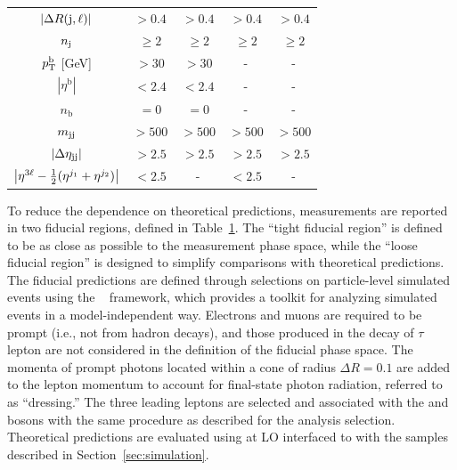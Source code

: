 \begin{table}[!ht]
\begin{center}
\begin{tabular}{c|c|c|c|c}
  $\left|\Delta R(\mathrm{j}, \ell)\right|$            & $ > 0.4$  & $> 0.4$       & $> 0.4$        & $> 0.4$ \\
  $n_{\mathrm{\mathrm{j}}}           $    & $\ge 2$   & $\ge 2$       & $\ge 2$        & $\ge 2$    \\
  $p_{\mathrm{T}}^{\mathrm{b}}         $ [GeV] & $ > 30$   & $ > 30$       &   -            &   -     \\
    $\left|\eta^{\mathrm{b}}\right|  $      & $< 2.4$   & $< 2.4$ &   -            &   -     \\
  $n_{\text{b}}       $         & $= 0$     & $= 0$         &   -            &   -     \\
  $m_{\mathrm{jj}}             $               & $> 500$   & $> 500$       & $> 500$        & $> 500$ \\
  $\left|\Delta\eta_{\mathrm{jj}} \right|$            &$> 2.5$         & $> 2.5$ & $> 2.5$ & $> 2.5$ \\
  $\left| \eta^{3\ell} - \frac{1}{2}(\eta^{j_{1}} + \eta^{j_{2}}) \right|$            & $< 2.5$ & - & $< 2.5$ & - \\
  \end{tabular}
  \label{tab:selections}
  \end{center}
\end{table}

To reduce the dependence on theoretical predictions, 
measurements are reported in two fiducial regions, defined in Table~\ref{tab:selections}.
The ``tight fiducial region'' is defined to be as close as possible to the measurement phase space,
while the ``loose fiducial region'' is designed to simplify comparisons with theoretical predictions.
The fiducial predictions are defined through selections on particle-level
simulated events using the \Rivet~\cite{Buckley:2010ar} framework, which 
provides a toolkit for analyzing simulated events in a model-independent way.
Electrons and muons are required to be prompt (i.e., not from hadron decays), 
and those produced in the decay of $\tau$ lepton
are not considered in the definition
of the fiducial phase space.
The momenta of prompt photons located within a cone of radius $\Delta R = 0.1$ are added to the lepton
momentum to account for final-state photon radiation, referred to as ``dressing.''
The three leading \pt leptons are selected and associated with the \W and \Z
bosons with the same procedure as described for the analysis selection.
Theoretical predictions are evaluated using \MG at LO interfaced to \PYTHIA with the samples
described in Section~\ref{sec:simulation}.

